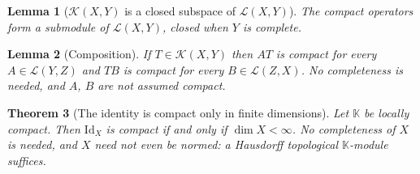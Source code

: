 \documentclass[a4paper]{report}
\theoremstyle{plain}
\newtheorem{theorem}{Theorem}[chapter]
\newtheorem{lemma}[theorem]{Lemma}
\theoremstyle{definition}
\theoremstyle{remark}
\begin{document}
\begin{lemma}[$\mathcal{K}(X,Y)$ is a closed subspace of $\mathcal{L}(X,Y)$]
  \label{lem_compact_closed}
  The compact operators form a submodule of $\mathcal{L}(X,Y)$, closed when $Y$ is
  complete.
\end{lemma}


\begin{lemma}[Composition]
  \label{lem_compact_comp}
  If $T \in \mathcal{K}(X,Y)$ then $AT$ is compact for every $A \in \mathcal{L}(Y,Z)$ and
  $TB$ is compact for every $B \in \mathcal{L}(Z,X)$.  No completeness is needed, and
  $A$, $B$ are not assumed compact.
\end{lemma}


\begin{theorem}[The identity is compact only in finite dimensions]
  \label{thm_id_compact}
  Let $\mathbb{K}$ be locally compact.  Then $\mathrm{Id}_X$ is compact if and only
  if $\dim X < \infty$.  No completeness of $X$ is needed, and $X$ need not even be
  normed: a Hausdorff topological $\mathbb{K}$-module suffices.
\end{theorem}
\end{document}
